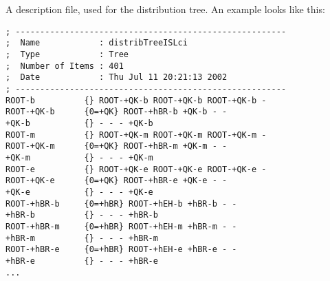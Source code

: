
\section{}

A  description file, used for the distribution
tree. An example looks like this:

\begin{verbatim}
; -------------------------------------------------------
;  Name            : distribTreeISLci
;  Type            : Tree
;  Number of Items : 401
;  Date            : Thu Jul 11 20:21:13 2002
; -------------------------------------------------------
ROOT-b          {} ROOT-+QK-b ROOT-+QK-b ROOT-+QK-b -
ROOT-+QK-b      {0=+QK} ROOT-+hBR-b +QK-b - -
+QK-b           {} - - - +QK-b
ROOT-m          {} ROOT-+QK-m ROOT-+QK-m ROOT-+QK-m -
ROOT-+QK-m      {0=+QK} ROOT-+hBR-m +QK-m - -
+QK-m           {} - - - +QK-m
ROOT-e          {} ROOT-+QK-e ROOT-+QK-e ROOT-+QK-e -
ROOT-+QK-e      {0=+QK} ROOT-+hBR-e +QK-e - -
+QK-e           {} - - - +QK-e
ROOT-+hBR-b     {0=+hBR} ROOT-+hEH-b +hBR-b - -
+hBR-b          {} - - - +hBR-b
ROOT-+hBR-m     {0=+hBR} ROOT-+hEH-m +hBR-m - -
+hBR-m          {} - - - +hBR-m
ROOT-+hBR-e     {0=+hBR} ROOT-+hEH-e +hBR-e - -
+hBR-e          {} - - - +hBR-e
...
\end{verbatim}


